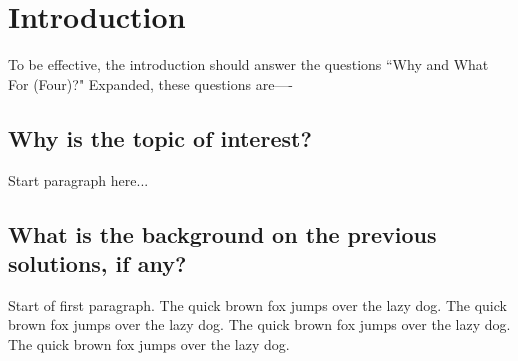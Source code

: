 \documentclass[journal]{./IEEE/IEEEtran}
\title{\SPTITLE}
\author{\ADVISEE~and~\ADVISER%
\REMARK
}
\begin{document}
\maketitle

\begin{abstract}

This article explores the role and importance of roommates in college students' \textit{in UPLB} development, from the initial adaptation in the roommate setting, to their grades, and to their life after college. We highlight the importance of finding the proper roommates and propose a solution in the form of a web application to help UPLB students find the proper roommates for their college life. This solution also extends itself to solve the \textit{dorm-finding} problem we experience. ~\cite{01}
\end{abstract}


\section{Introduction}
To be effective, the introduction should answer the questions ``Why and What For (Four)?" Expanded, these questions are----

\subsection{Why is the topic of interest?}
Start paragraph here...

\subsection{What is the background on the previous solutions, if any?}
Start of first paragraph. The quick brown fox jumps over the lazy dog. The quick
brown fox jumps over the lazy dog. The quick brown fox jumps over the lazy dog. The
quick brown fox jumps over the lazy dog.
\end{document}
